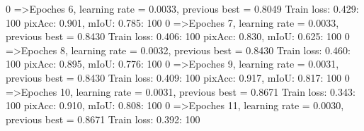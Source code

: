   0%
=>Epoches 6, learning rate = 0.0033,                 previous best = 0.8049
Train loss: 0.429: 100%
pixAcc: 0.901, mIoU: 0.785: 100%
  0%
=>Epoches 7, learning rate = 0.0033,                 previous best = 0.8430
Train loss: 0.406: 100%
pixAcc: 0.830, mIoU: 0.625: 100%
  0%
=>Epoches 8, learning rate = 0.0032,                 previous best = 0.8430
Train loss: 0.460: 100%
pixAcc: 0.895, mIoU: 0.776: 100%
  0%
=>Epoches 9, learning rate = 0.0031,                 previous best = 0.8430
Train loss: 0.409: 100%
pixAcc: 0.917, mIoU: 0.817: 100%
  0%
=>Epoches 10, learning rate = 0.0031,                 previous best = 0.8671
Train loss: 0.343: 100%
pixAcc: 0.910, mIoU: 0.808: 100%
  0%
=>Epoches 11, learning rate = 0.0030,                 previous best = 0.8671
Train loss: 0.392: 100%
